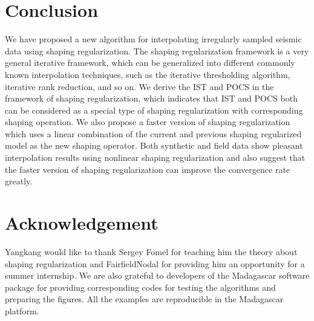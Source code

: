 

\section{Conclusion}
We have proposed a new algorithm for interpolating irregularly sampled seismic data using shaping regularization. The shaping regularization framework is a very general iterative framework, which can be generalized into different commonly known interpolation techniques, such as the iterative thresholding algorithm, iterative rank reduction, and so on. We derive the IST and POCS in the framework of shaping regularization, which indicates that IST and POCS both can be considered as a special type of shaping regularization with corresponding shaping operation. We also propose a faster version of shaping regularization which uses a linear combination of the current and previous shaping regularized model as the new shaping operator. Both synthetic and field data show pleasant interpolation results using nonlinear shaping regularization and also suggest that the faster version of shaping regularization can improve the convergence rate greatly. 

\section{Acknowledgement}
Yangkang would like to thank Sergey Fomel for teaching him the theory about shaping regularization and FairfieldNodal for providing him an opportunity for a summer internship. We are also grateful to developers of the Madagascar software package \cite[]{mada2013} for providing corresponding codes for testing the algorithms and preparing the figures. All the examples are reproducible in the Madagascar platform.


\onecolumn





